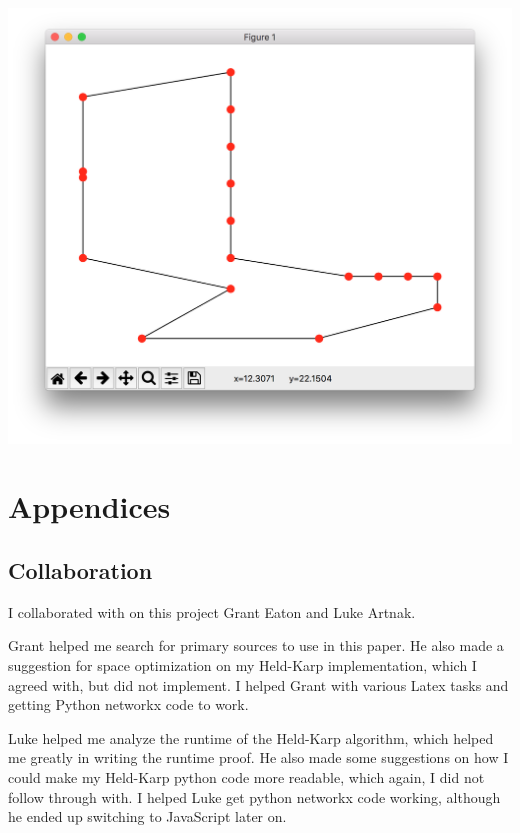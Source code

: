\documentclass[11pt,fleqn]{article}
\begin{document}
\centering
\includegraphics[scale=0.5]{plot.png}


\newpage
\appendix
\section*{Appendices}
\newpage
{}
\renewcommand{\thesubsection}{\Alph{subsection}}

\subsection{Collaboration}
  I collaborated with on this project Grant Eaton and Luke Artnak.
  \par

  Grant helped me search for primary sources to use in this paper.
  He also made a suggestion
  for space optimization on my Held-Karp implementation, which
  I agreed with, but did not implement.  I helped Grant
  with various Latex tasks and getting Python networkx code
  to work.

  Luke helped me analyze the runtime of the Held-Karp algorithm,
  which helped me greatly in writing the runtime proof.  He also
  made some suggestions on how I could make my Held-Karp python code
  more readable, which again, I did not follow through with.  I helped
  Luke get python networkx code working, although he ended up
  switching to JavaScript later on.

  \par
\end{document}
